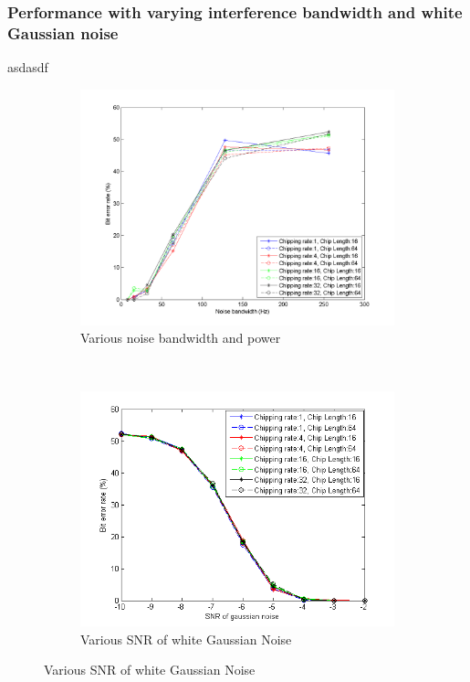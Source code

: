		
		\subsubsection{Performance with varying interference bandwidth and white Gaussian noise}
		asdasdf
	
		\begin{figure}[H]
			\centering
			\begin{subfigure}[b]{0.5\textwidth}
				\includegraphics[width=\textwidth]{imgs/results/plot_mode_fhss-test_bandwidthAndPower-rep_20-dataRate_8-dataLength_128.png}
				\caption{Various noise bandwidth and power}
				\label{fig:fhss_bandwidth}
			\end{subfigure}%
			~
			\begin{subfigure}[b]{0.5\textwidth}
				\includegraphics[width=\textwidth]{imgs/results/plot_mode_fhss-test_gaussianSNR-rep_20-dataRate_8-dataLength_128_fixedlegend.png}
				\caption{Various SNR of white Gaussian Noise}
				\label{fig:fhss_gaussian}
			\end{subfigure}
		\end{figure}
		
